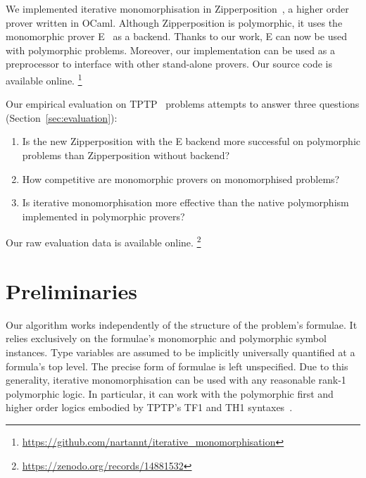 \documentclass[runningheads]{llncs}
\begin{document}
We implemented iterative monomorphisation in Zipperposition~\cite{vukmirovic-et-al-2021}, a higher order prover written in OCaml. Although Zipperposition is polymorphic, it uses the monomorphic prover E~\cite{e} as a backend. Thanks to our work, E can now be used with polymorphic problems. Moreover, our implementation can be used as a preprocessor to interface with other stand-alone provers.
Our source code is available online.%
\footnote{\url{https://github.com/nartannt/iterative_monomorphisation}}

Our empirical evaluation on TPTP~\cite{tptp} problems attempts to answer three questions (Section~\ref{sec:evaluation}):
\begin{enumerate}
\item Is the new Zipperposition with the E backend more successful on polymorphic problems than Zipperposition without backend?

\item How competitive are monomorphic provers on monomorphised %
problems?

\item Is iterative monomorphisation more effective than the native polymorphism implemented in polymorphic provers?
\end{enumerate}
%
Our raw evaluation data is available online.%
\footnote{\url{https://zenodo.org/records/14881532}}

%
%

\section{Preliminaries}
\label{sec:preliminaries}

Our algorithm works independently of the structure of the problem's formulae. It relies exclusively on the formulae's monomorphic and polymorphic symbol instances. Type variables are assumed to be implicitly universally quantified at a formula's top level. The precise form of formulae is left unspecified.
Due to this generality, iterative monomorphisation can be used with any reasonable rank-1 polymorphic logic. In particular, it can work with the polymorphic first and higher order logics embodied by TPTP's TF1 and TH1 syntaxes~\cite{blanchette-paskevich-2013,th1}.
\end{document}
